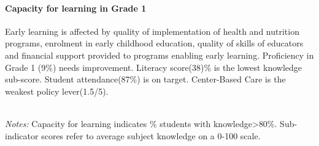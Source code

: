 \documentclass[twocolumn]{article}
\let\oldparagraph\paragraph
\renewcommand{\paragraph}[1]{\oldparagraph{#1}\mbox{}}
\begin{document}
\hypertarget{capacity-for-learning-in-grade-1}{%
\paragraph{\texorpdfstring{\textbf{Capacity for learning in Grade
1}}{Capacity for learning in Grade 1}}\label{capacity-for-learning-in-grade-1}}

Early learning is affected by quality of implementation of health and
nutrition programs, enrolment in early childhood education, quality of
skills of educators and financial support provided to programs enabling
early learning. Proficiency in Grade 1 (9\%) needs improvement. Literacy
score(38)\% is the lowest knowledge sub-score. Student attendance(87\%)
is on target. Center-Based Care is the weakest policy lever(1.5/5).

\begin{table}[H]
\\
\color{darkgray}\scriptsize{\textit{Notes:} Capacity for learning indicates \% students with knowledge\textgreater{80\%}. Sub-indicator scores refer to average subject knowledge on a 0-100 scale.}
\end{table}
\raggedbottom
\end{document}
